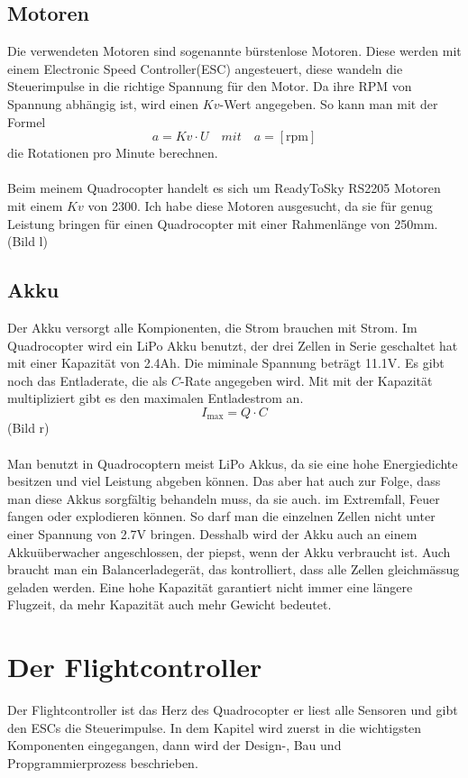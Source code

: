 \documentclass[12pt,a4paper, ngerman]{article}
\begin{document}
\subsection{Motoren}
Die verwendeten Motoren sind sogenannte bürstenlose Motoren. Diese werden mit einem Electronic Speed Controller(ESC) angesteuert, diese wandeln die Steuerimpulse in die richtige Spannung für den Motor. Da ihre RPM von Spannung abhängig ist, wird einen $Kv$-Wert angegeben. So kann man mit der Formel
\begin{equation}
a=Kv\cdot U \quad mit \quad a=[\text{rpm}]
\end{equation}
die Rotationen pro Minute berechnen.\\ \\
Beim meinem Quadrocopter handelt es sich um ReadyToSky RS2205 Motoren mit einem $Kv$ von 2300. Ich habe diese Motoren ausgesucht, da sie für genug Leistung bringen für einen Quadrocopter mit einer Rahmenlänge von 250mm.(Bild l)
\subsection{Akku}
Der Akku versorgt alle Kompionenten, die Strom brauchen mit Strom. Im Quadrocopter wird ein LiPo Akku benutzt, der drei Zellen in Serie geschaltet hat mit einer Kapazität von 2.4Ah. Die miminale Spannung beträgt 11.1V. Es gibt noch das Entladerate, die als $C$-Rate angegeben wird. Mit mit der Kapazität multipliziert gibt es den maximalen Entladestrom an.\cite{website:fpvracing.ch_Mult_Komp}
\begin{equation}
I_{\text{max}}=Q\cdot C
\end{equation} (Bild r)\\ \\
Man benutzt in Quadrocoptern meist LiPo Akkus, da sie eine hohe Energiedichte besitzen und viel Leistung abgeben können. Das aber hat auch zur Folge, dass man diese Akkus sorgfältig behandeln muss, da sie auch. im Extremfall, Feuer fangen oder explodieren können. So darf man die einzelnen Zellen nicht unter einer Spannung von 2.7V bringen. Desshalb wird der Akku auch an einem Akkuüberwacher angeschlossen, der piepst, wenn der Akku verbraucht ist. Auch braucht man ein Balancerladegerät, das kontrolliert, dass alle Zellen gleichmässug geladen werden. Eine hohe Kapazität garantiert nicht immer eine längere Flugzeit, da mehr Kapazität auch mehr Gewicht bedeutet.\cite{website:fpvracing.ch_Mult_Komp}
\newpage

\section{Der Flightcontroller}
Der Flightcontroller ist das Herz des Quadrocopter er liest alle Sensoren und gibt den ESCs die Steuerimpulse. In dem Kapitel wird zuerst in die wichtigsten Komponenten eingegangen, dann wird der Design-, Bau und Propgrammierprozess beschrieben.
\end{document}
